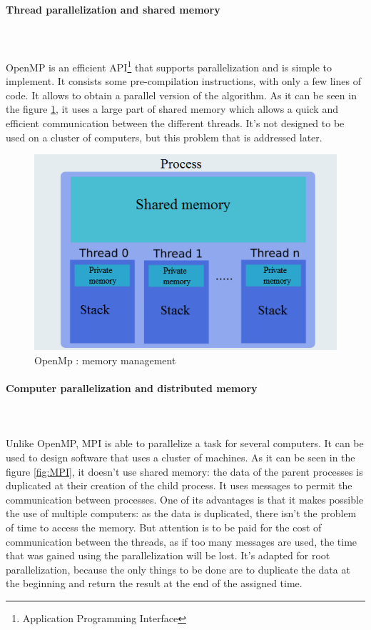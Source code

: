 \paragraph{Thread parallelization and shared memory}\mbox{}\\\mbox{}\\
OpenMP is an efficient API\footnote{Application Programming Interface} that supports parallelization and is simple to implement. It consists some pre-compilation instructions, with only a few lines of code. It allows to obtain a parallel version of the algorithm. As it can be seen in the figure \ref{fig:OpenMp}, it uses a large part of shared memory which allows a quick and efficient communication between the different threads. It's not designed to be used on a cluster of computers, but this problem that is addressed later.
\begin{figure}[!h] 
\centerline{\includegraphics[scale=0.50]{3_Software_considered/MultithreadingMP_boost_Visual_MPI_5000_Zotero_Project_Baptiste/OpenMP}}
   \caption{\label{étiquette} OpenMp : memory management}
\label{fig:OpenMp}
\end{figure}
\newpage
\paragraph{Computer parallelization and distributed memory}\mbox{}\\\mbox{}\\
Unlike OpenMP, MPI is able to parallelize a task for several computers. It can be used to design software that uses a cluster of machines. As it can be seen in the figure \ref{fig:MPI}, it doesn't use shared memory: the data of the parent processes is duplicated at their creation of the child process. It uses messages to permit the communication between processes. One of its advantages is that it makes possible the use of multiple computers: as the data is duplicated, there isn't the problem of time to access the memory. But attention is to be paid for the cost of communication between the threads, as if too many messages are used, the time that was gained using the parallelization will be lost. It's adapted for root parallelization, because the only things to be done are to duplicate the data at the beginning and return the result at the end of the assigned time.

